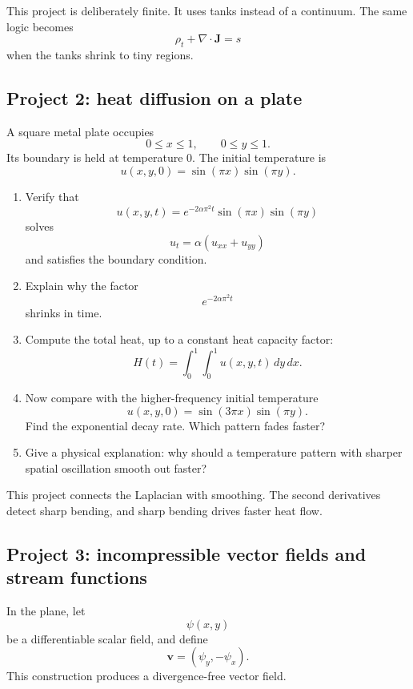 This project is deliberately finite.  It uses tanks instead of a continuum.  The same
logic becomes
\[
    \rho_t+\nabla\cdot\mathbf J=s
\]
when the tanks shrink to tiny regions.

\subsection{Project 2: heat diffusion on a plate}

A square metal plate occupies
\[
    0\le x\le1,\qquad 0\le y\le1.
\]
Its boundary is held at temperature \(0\).  The initial temperature is
\[
    u(x,y,0)=\sin(\pi x)\sin(\pi y).
\]

\begin{enumerate}
\item Verify that
\[
    u(x,y,t)=e^{-2\alpha\pi^2t}\sin(\pi x)\sin(\pi y)
\]
solves
\[
    u_t=\alpha(u_{xx}+u_{yy})
\]
and satisfies the boundary condition.

\item Explain why the factor
\[
    e^{-2\alpha\pi^2t}
\]
shrinks in time.

\item Compute the total heat, up to a constant heat capacity factor:
\[
    H(t)=\int_0^1\int_0^1 u(x,y,t)\,dy\,dx.
\]

\item Now compare with the higher-frequency initial temperature
\[
    u(x,y,0)=\sin(3\pi x)\sin(\pi y).
\]
Find the exponential decay rate.  Which pattern fades faster?

\item Give a physical explanation: why should a temperature pattern with sharper
spatial oscillation smooth out faster?
\end{enumerate}

This project connects the Laplacian with smoothing.  The second derivatives detect
sharp bending, and sharp bending drives faster heat flow.

\subsection{Project 3: incompressible vector fields and stream functions}

In the plane, let
\[
    \psi(x,y)
\]
be a differentiable scalar field, and define
\[
\boxed{
    \mathbf v=(\psi_y,-\psi_x).
}
\]
This construction produces a divergence-free vector field.


